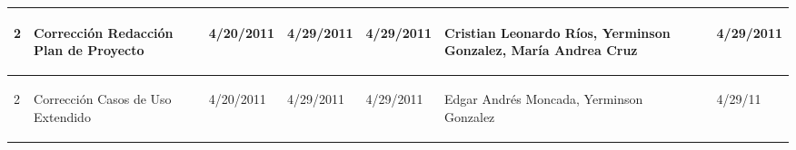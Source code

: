 \begin{center}
\begin{longtable}{|p{}|p{}|p{}|p{}|p{}|p{}|p{}|p{}|}
{\begin{center} 2 \end{center}} & 
{\begin{center} Corrección Redacción Plan de Proyecto \end{center}} & 
{\begin{center} 4/20/2011 \end{center}} & 
{\begin{center} 4/29/2011 \end{center}} & 
{\begin{center} 4/29/2011 \end{center}} & 
{\begin{center} Cristian Leonardo Ríos, Yerminson Gonzalez, María Andrea Cruz \end{center}} & 
{\begin{center}  \end{center}} & 
{\begin{center} 4/29/2011 \end{center}}\\
\hline

{\begin{center} 2 \end{center}} & 
{\begin{center} Corrección Casos de Uso Extendido \end{center}} & 
{\begin{center} 4/20/2011 \end{center}} & 
{\begin{center} 4/29/2011 \end{center}} & 
{\begin{center} 4/29/2011 \end{center}} & 
{\begin{center} Edgar Andrés Moncada, Yerminson Gonzalez \end{center}} & 
{\begin{center}  \end{center}} & 
{\begin{center} 4/29/11 \end{center}}\\
\hline


\end{longtable}
\end{center}
